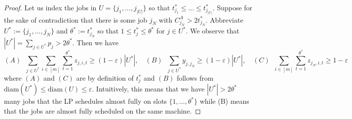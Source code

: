 \begin{proof}
  Let us index the jobs in $U = \{ j_1,\ldots,j_{|U|}\}$ so that $t_{j_1}^* \leq \ldots \leq t_{j_{|U|}}^*$.
  Suppose for the sake of contradiction that there is some job $j_N$ with $C_{j_N}^A > 2 t_{j_N}^*$.
  Abbreviate $U^* := \{ j_1,\ldots,j_N\}$ and $\theta^* := t_{j_N}^*$ so that  $1 \leq t_j^* \leq \theta^*$ for $j \in U^*$.
  We observe that $|U^*| = \sum_{j \in U^*} p_j > 2\theta^*$. Then we have
  \[
(A) \;\; \sum_{j \in U^*} \sum_{i \in [m]} \sum_{t=1}^{\theta^*} z_{j,i,t} \geq (1-\varepsilon)|U^*|, \quad (B) \;\; \sum_{j \in U^*} y_{j,j_N} \geq (1-\varepsilon)|U^*|, \quad  (C) \;\; \sum_{i \in [m]} \sum_{t=1}^{\theta^*} z_{j_N,i,t} \geq 1-\varepsilon
\]
where $(A)$ and $(C)$ are by definition of $t_j^*$ and $(B)$ follows from $\textrm{diam}(U^*) \leq \textrm{diam}(U) \leq \varepsilon$.
Intuitively, this means that we have $|U^*| > 2\theta^*$ many jobs that the LP schedules almost fully
on slots $\{1,\ldots,\theta^*\}$ while (B) means that the jobs are almost fully scheduled on the same machine.


\end{proof}
